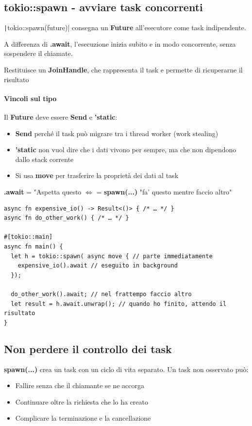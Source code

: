 \subsection{tokio::spawn - avviare task concorrenti}


\texttt|tokio::spawn(future)| consegna un \textbf{Future}
all'esecutore come task indipendente.

A differenza di \textbf{.await},  l'esecuzione inizia subito e in modo concorrente, senza sospendere il
chiamate.

Restituisce un \textbf{JoinHandle}, che rappresenta il task e permette di ricuperarne il risultato


\paragraph{Vincoli sul tipo}

Il \textbf{Future} deve essere \textbf{Send} e \textbf{'static}:

\begin{itemize}
  \item \textbf{Send} perché il task può migrare tra i thread worker (work stealing)
  \item \textbf{'static} non vuol dire che i dati vivono per sempre, ma che non dipendono dallo stack corrente
  \item Si usa \textbf{move} per trasferire la proprietà dei dati al task
\end{itemize}

\textbf{.await} = "Aspetta questo $\Leftrightarrow$ = \textbf{spawn(...)} "fa' questo mentre faccio altro"


\begin{verbatim}
async fn expensive_io() -> Result<()> { /* … */ }
async fn do_other_work() { /* … */ }

#[tokio::main]
async fn main() {
  let h = tokio::spawn( async move { // parte immediatamente
    expensive_io().await // eseguito in background
  });

  do_other_work().await; // nel frattempo faccio altro
  let result = h.await.unwrap(); // quando ho finito, attendo il risultato
}
\end{verbatim}

\subsection{Non perdere il controllo dei task}

\textbf{spawn(...)} crea un task con un ciclo di vita separato.
Un task non osservato può:
\begin{itemize}

  \item Fallire senza che il chiamante se ne accorga
  \item Continuare oltre la richiesta che lo ha creato
  \item Complicare la terminazione e la cancellazione
\end{itemize}



